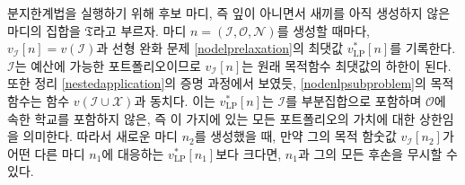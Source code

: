 \documentclass[11pt]{article} %
\newif\ifen
\theoremstyle{definition}
\theoremstyle{definition}
\begin{document}
\ifen
To implement the branch-and-bound algorithm, we represent the set of candidate nodes---namely, nonleaf nodes whose children have not yet been generated---by $\mathfrak{T}$. Each time a node $n= (\mathcal{I}, \mathcal{O}, \mathcal{N})$ is generated, we record the values $v_{\mathcal{I}}[n] = v(\mathcal{I})$ and $v^*_{\mathrm{LP}}[n]$, the optimal objective value of the LP relaxation \eqref{nodelprelaxation}. Because $\mathcal{I}$ is a feasible portfolio, $v_{\mathcal{I}}[n]$ is a lower bound on the optimal objective value. Moreover, by the argument given in the proof of Theorem \ref{nestedapplication}, the objective function of  \eqref{nodenlpsubproblem} is identical to the function $v(\mathcal{I} \cup \mathcal{X})$. This means that $v_{\mathrm{LP}}^*[n]$  is an upper bound on the valuation of any portfolio that contains $\mathcal{I}$ as a subset and does not include any school in $\mathcal{O}$, and hence on the valuation of any portfolio on this branch. Therefore, if upon generating a new node $n_2$, we discover that its objective value $v_{\mathcal{I}}[n_2]$ is greater than $v_{\mathrm{LP}}^*[n_1]$ for some other node $n_1$, then we can disregard $n_1$ and all its descendants. 
\else
분지한계법을 실행하기 위해 후보 마디, 즉 잎이 아니면서 새끼를 아직 생성하지 않은 마디의 집합을  $\mathfrak{T}$라고 부르자. 마디 $n= (\mathcal{I}, \mathcal{O}, \mathcal{N})$를 생성할 때마다, $v_{\mathcal{I}}[n] = v(\mathcal{I})$과 선형 완화 문제 \eqref{nodelprelaxation}의 최댓값 $v^*_{\mathrm{LP}}[n]$를 기록한다. $\mathcal{I}$는 예산에 가능한 포트폴리오이므로 $v_{\mathcal{I}}[n]$는 원래 목적함수 최댓값의 하한이 된다. 또한 정리 \ref{nestedapplication}의 증명 과정에서 보였듯, \eqref{nodenlpsubproblem}의 목적함수는 함수 $v(\mathcal{I} \cup \mathcal{X})$과 동치다. 이는 $v_{\mathrm{LP}}^*[n]$는 $\mathcal{I}$를 부분집합으로 포함하며 $\mathcal{O}$에 속한 학교를 포함하지 않은, 즉 이 가지에 있는 모든 포트폴리오의 가치에 대한 상한임을 의미한다. 따라서 새로운 마디 $n_2$를 생성했을 때, 만약 그의 목적 함숫값 $v_{\mathcal{I}}[n_2]$가 어떤 다른 마디 $n_1$에 대응하는 $v_{\mathrm{LP}}^*[n_1]$보다 크다면, $n_1$과 그의 모든 후손을 무시할 수 있다.
\fi
\end{document}
